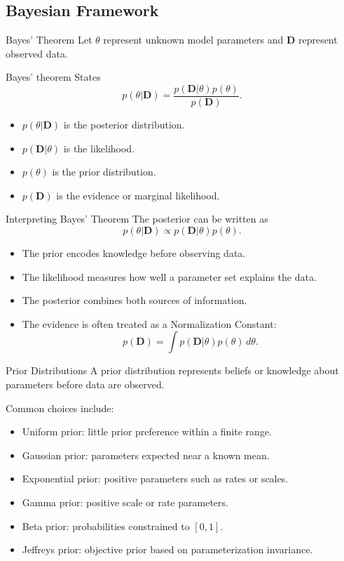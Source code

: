 \documentclass[a4paper, 10pt, onepage]{elegantbook}
\begin{document}
{\subsection{Bayesian Framework}

\begin{frame}{Bayes' Theorem}
  Let \(\theta\) represent unknown model parameters and \(\mathbf{D}\) represent observed data.

  Bayes' theorem States
  \[
    p(\theta|\mathbf{D})
    =
    \frac{
      p(\mathbf{D}|\theta)p(\theta)
    }{
      p(\mathbf{D})
    }.
  \]

  \begin{itemize}
    \item \(p(\theta|\mathbf{D})\) is the posterior distribution.
    \item \(p(\mathbf{D}|\theta)\) is the likelihood.
    \item \(p(\theta)\) is the prior distribution.
    \item \(p(\mathbf{D})\) is the evidence or marginal likelihood.
  \end{itemize}
\end{frame}

\begin{frame}{Interpreting Bayes' Theorem}
  The posterior can be written as
  \[
    p(\theta|\mathbf{D})
    \propto
    p(\mathbf{D}|\theta)p(\theta).
  \]

  \begin{itemize}
    \item The prior encodes knowledge before observing data.
    \item The likelihood measures how well a parameter set explains the data.
    \item The posterior combines both sources of information.
    \item The evidence is often treated as a Normalization Constant:
    \[
      p(\mathbf{D})
      =
      \int p(\mathbf{D}|\theta)p(\theta)\,d\theta.
    \]
  \end{itemize}
\end{frame}

\begin{frame}{Prior Distributions}
  A prior distribution represents beliefs or knowledge about parameters before data are observed.

  Common choices include:
  \begin{itemize}
    \item Uniform prior: little prior preference within a finite range.
    \item Gaussian prior: parameters expected near a known mean.
    \item Exponential prior: positive parameters such as rates or scales.
    \item Gamma prior: positive scale or rate parameters.
    \item Beta prior: probabilities constrained to \([0,1]\).
    \item Jeffreys prior: objective prior based on parameterization invariance.
  \end{itemize}


\end{frame}}
\end{document}
